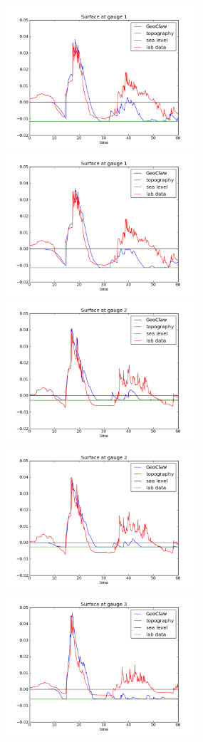 \begin{figure}[ht]
\hfil\includegraphics[width=2.8in]{bp7/figs423/gauge0001fig300.png}\hfil
\hfil\includegraphics[width=2.8in]{bp7/figs160/gauge0001fig300.png}\hfil
\vskip 5pt
\hfil\includegraphics[width=2.8in]{bp7/figs423/gauge0002fig300.png}\hfil
\hfil\includegraphics[width=2.8in]{bp7/figs160/gauge0002fig300.png}\hfil
\vskip 5pt
\hfil\includegraphics[width=2.8in]{bp7/figs423/gauge0003fig300.png}\hfil

\end{figure}
